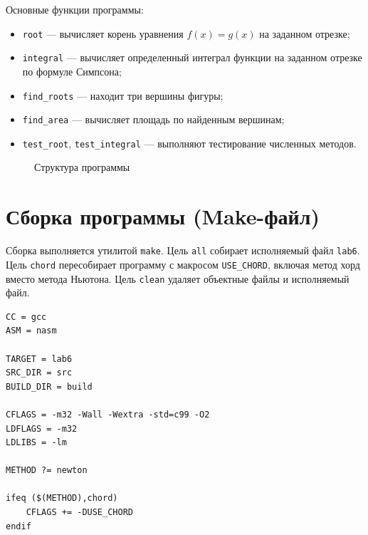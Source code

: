 \documentclass[a4paper,12pt,titlepage,finall]{article}
\begin{document}
Основные функции программы:
\begin{itemize}
\item \texttt{root} --- вычисляет корень уравнения $f(x)=g(x)$ на
    заданном отрезке;
\item \texttt{integral} --- вычисляет определенный интеграл функции на
    заданном отрезке по формуле Симпсона;
\item \texttt{find\_roots} --- находит три вершины фигуры;
\item \texttt{find\_area} --- вычисляет площадь по найденным вершинам;
\item \texttt{test\_root}, \texttt{test\_integral} --- выполняют
    тестирование численных методов.
\end{itemize}

\begin{figure}[h]
\centering
{}
\caption{Структура программы}
\label{structure}
\end{figure}

\newpage

\section{Сборка программы (Make-файл)}

Сборка выполняется утилитой \texttt{make}. Цель \texttt{all} собирает
исполняемый файл \texttt{lab6}. Цель \texttt{chord} пересобирает
программу с макросом \texttt{USE\_CHORD}, включая метод хорд вместо
метода Ньютона. Цель \texttt{clean} удаляет объектные файлы и
исполняемый файл.

\begin{verbatim}
CC = gcc
ASM = nasm

TARGET = lab6
SRC_DIR = src
BUILD_DIR = build

CFLAGS = -m32 -Wall -Wextra -std=c99 -O2
LDFLAGS = -m32
LDLIBS = -lm

METHOD ?= newton

ifeq ($(METHOD),chord)
    CFLAGS += -DUSE_CHORD
endif
\end{verbatim}
\end{document}
